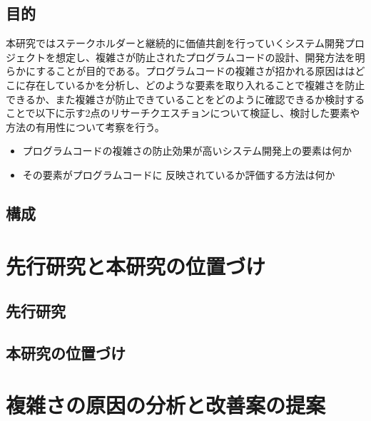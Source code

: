 \documentclass[11pt, a4paper]{jreport}
\begin{document}
\section{目的}
本研究ではステークホルダーと継続的に価値共創を行っていくシステム開発プロジェクトを想定し、複雑さが防止されたプログラムコードの設計、開発方法を明らかにすることが目的である。プログラムコードの複雑さが招かれる原因ははどこに存在しているかを分析し、どのような要素を取り入れることで複雑さを防止できるか、また複雑さが防止できていることをどのように確認できるか検討することで以下に示す2点のリサーチクエスチョンについて検証し、検討した要素や方法の有用性について考察を行う。
\begin{itemize}
\item プログラムコードの複雑さの防止効果が高いシステム開発上の要素は何か
\item その要素がプログラムコードに
反映されているか評価する方法は何か
\end{itemize}
\section{構成}

\chapter{先行研究と本研究の位置づけ}
\section{先行研究}
\subsection{}
\subsection{}
\section{本研究の位置づけ}
\chapter{複雑さの原因の分析と改善案の提案}
\end{document}
